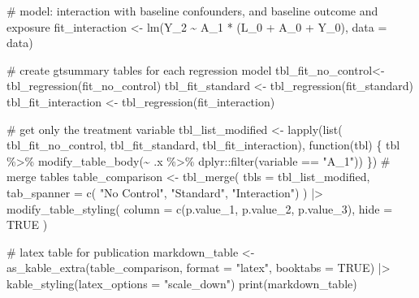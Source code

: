 \documentclass[
  singlecolumn]{article}
\newenvironment{Shaded}{}{}
\newcommand{\AttributeTok}[1]{\textcolor[rgb]{0.84,0.23,0.29}{#1}}
\newcommand{\CommentTok}[1]{\textcolor[rgb]{0.42,0.45,0.49}{#1}}
\newcommand{\ConstantTok}[1]{\textcolor[rgb]{0.00,0.36,0.77}{#1}}
\newcommand{\ControlFlowTok}[1]{\textcolor[rgb]{0.84,0.23,0.29}{#1}}
\newcommand{\FunctionTok}[1]{\textcolor[rgb]{0.44,0.26,0.76}{#1}}
\newcommand{\NormalTok}[1]{\textcolor[rgb]{0.14,0.16,0.18}{#1}}
\newcommand{\OtherTok}[1]{\textcolor[rgb]{0.44,0.26,0.76}{#1}}
\newcommand{\SpecialCharTok}[1]{\textcolor[rgb]{0.00,0.36,0.77}{#1}}
\newcommand{\StringTok}[1]{\textcolor[rgb]{0.01,0.18,0.38}{#1}}
\begin{document}
\begin{Shaded}
\begin{Highlighting}[]
\CommentTok{\# model: interaction with baseline confounders, and baseline outcome and exposure}
\NormalTok{fit\_interaction  }\OtherTok{\textless{}{-}} \FunctionTok{lm}\NormalTok{(Y\_2 }\SpecialCharTok{\textasciitilde{}}\NormalTok{ A\_1 }\SpecialCharTok{*}\NormalTok{ (L\_0 }\SpecialCharTok{+}\NormalTok{ A\_0 }\SpecialCharTok{+}\NormalTok{ Y\_0), }\AttributeTok{data =}\NormalTok{ data)}

\CommentTok{\# create gtsummary tables for each regression model}
\NormalTok{tbl\_fit\_no\_control}\OtherTok{\textless{}{-}} \FunctionTok{tbl\_regression}\NormalTok{(fit\_no\_control)  }
\NormalTok{tbl\_fit\_standard }\OtherTok{\textless{}{-}} \FunctionTok{tbl\_regression}\NormalTok{(fit\_standard)}
\NormalTok{tbl\_fit\_interaction }\OtherTok{\textless{}{-}} \FunctionTok{tbl\_regression}\NormalTok{(fit\_interaction)}

\CommentTok{\# get only the treatment variable}
\NormalTok{tbl\_list\_modified }\OtherTok{\textless{}{-}} \FunctionTok{lapply}\NormalTok{(}\FunctionTok{list}\NormalTok{(}
\NormalTok{  tbl\_fit\_no\_control,}
\NormalTok{  tbl\_fit\_standard,}
\NormalTok{  tbl\_fit\_interaction),}
\ControlFlowTok{function}\NormalTok{(tbl) \{}
\NormalTok{  tbl }\SpecialCharTok{\%\textgreater{}\%}
    \FunctionTok{modify\_table\_body}\NormalTok{(}\SpecialCharTok{\textasciitilde{}}\NormalTok{ .x }\SpecialCharTok{\%\textgreater{}\%}\NormalTok{ dplyr}\SpecialCharTok{::}\FunctionTok{filter}\NormalTok{(variable }\SpecialCharTok{==} \StringTok{"A\_1"}\NormalTok{))}
\NormalTok{\})}
\CommentTok{\# merge tables}
\NormalTok{table\_comparison }\OtherTok{\textless{}{-}} \FunctionTok{tbl\_merge}\NormalTok{(}
  \AttributeTok{tbls =}\NormalTok{ tbl\_list\_modified,}
  \AttributeTok{tab\_spanner =} \FunctionTok{c}\NormalTok{(}
    \StringTok{"No Control"}\NormalTok{,}
    \StringTok{"Standard"}\NormalTok{,}
    \StringTok{"Interaction"}\NormalTok{)}
\NormalTok{) }\SpecialCharTok{|\textgreater{}}
  \FunctionTok{modify\_table\_styling}\NormalTok{(}
    \AttributeTok{column =} \FunctionTok{c}\NormalTok{(p.value\_1, p.value\_2, p.value\_3),}
    \AttributeTok{hide =} \ConstantTok{TRUE}
\NormalTok{  )}

\CommentTok{\# latex table for publication}
\NormalTok{markdown\_table }\OtherTok{\textless{}{-}}
  \FunctionTok{as\_kable\_extra}\NormalTok{(table\_comparison, }\AttributeTok{format =} \StringTok{"latex"}\NormalTok{, }\AttributeTok{booktabs =} \ConstantTok{TRUE}\NormalTok{) }\SpecialCharTok{|\textgreater{}}
  \FunctionTok{kable\_styling}\NormalTok{(}\AttributeTok{latex\_options =} \StringTok{"scale\_down"}\NormalTok{)}
\FunctionTok{print}\NormalTok{(markdown\_table)}
\end{Highlighting}
\end{Shaded}
\end{document}

